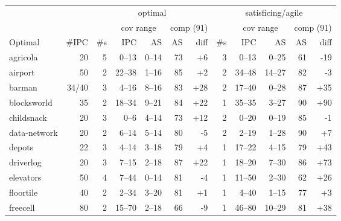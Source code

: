 \documentclass{article}
\begin{document}
            \begin{table} \centering
            \begin{tabular}{l@{}rr|rrrr|r|rrrr}
& & \multicolumn{5}{c}{optimal} & \multicolumn{5}{c}{satisficing/agile} \\

& & & \multicolumn{2}{c}{cov range} & \multicolumn{2}{c}{comp (91)} & & \multicolumn{2}{c}{cov range} & \multicolumn{2}{c}{comp (91)} \\

       Optimal &  \#IPC & \#s &      IPC &      AS &  AS &               diff & \#s &       IPC &      AS &  AS &               diff \\
\midrule
      agricola &     20 &   5 &    0--13 &   0--14 &  73 &   {\color{blue}+6} &   3 &     0--13 &   0--25 &  61 &   {\color{red}-19} \\
       airport &     50 &   2 &   22--38 &   1--16 &  85 &   {\color{blue}+2} &   2 &    34--48 &  14--27 &  82 &    {\color{red}-3} \\
        barman &  34/40 &   3 &    4--16 &   8--16 &  83 &  {\color{blue}+28} &   2 &    17--40 &   0--28 &  87 &  {\color{blue}+35} \\
   blocksworld &     35 &   2 &   18--34 &   9--21 &  84 &  {\color{blue}+22} &   1 &    35--35 &   3--27 &  90 &  {\color{blue}+90} \\
    childsnack &     20 &   3 &     0--6 &   4--14 &  73 &  {\color{blue}+12} &   2 &     0--20 &   0--19 &  85 &    {\color{red}-1} \\
  data-network &     20 &   2 &    6--14 &   5--14 &  80 &    {\color{red}-5} &   2 &     2--19 &   1--28 &  90 &   {\color{blue}+7} \\
        depots &     22 &   3 &    4--14 &   3--18 &  79 &   {\color{blue}+4} &   1 &    17--22 &   4--15 &  79 &  {\color{blue}+43} \\
     driverlog &     20 &   3 &    7--15 &   2--18 &  87 &  {\color{blue}+22} &   1 &    18--20 &   7--30 &  86 &  {\color{blue}+73} \\
     elevators &     50 &   4 &    7--44 &   0--14 &  81 &    {\color{red}-4} &   1 &    11--50 &   2--30 &  62 &  {\color{blue}+26} \\
     floortile &     40 &   2 &    2--34 &   3--20 &  81 &   {\color{blue}+1} &   1 &     4--40 &   1--15 &  77 &   {\color{blue}+3} \\
      freecell &     80 &   2 &   15--70 &   2--18 &  66 &    {\color{red}-9} &   1 &    46--80 &  10--29 &  81 &  {\color{blue}+38} \\

\end{tabular}
\end{table}
\end{document}
